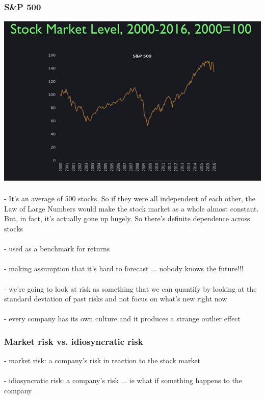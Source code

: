 \documentclass{article} %
\begin{document}
     		\subsubsection*{S\&P 500}
     		
			\includegraphics[width=\textwidth]{S&P 500 -- 2000-2016.png} \\
			\\
     		- It's an average of 500 stocks. So if they were all independent of each other, the Law of Large Numbers would make the stock market as a whole almost constant. But, in fact, it's actually gone up hugely. So there's definite dependence across stocks \\
     		\\
     		- used as a benchmark for returns \\
     		\\
     		- making assumption that it's hard to forecast ... nobody knows the future!!!\\
     		\\
     		- we're going to look at risk as something that we can quantify by looking at the standard deviation of past risks and not focus on what's new right now \\
     		\\
     		- every company has its own culture and it produces a strange outlier effect \\
     		\subsubsection*{Market risk vs. idiosyncratic risk}
     		- market risk: a company's risk in reaction to the stock market \\
     		\\
     		- idiosyncratic risk: a company's risk ... ie what if something happens to the company \\
     		\\
\end{document}
